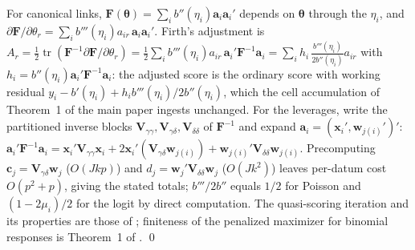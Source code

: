 \documentclass[11pt]{article}
\newcommand{\tr}{\operatorname{tr}}
\newcommand{\btheta}{\bm{\theta}}
\newcommand{\bx}{\mathbf{x}}
\newcommand{\bw}{\mathbf{w}}
\newcommand{\ba}{\mathbf{a}}
\newcommand{\bc}{\mathbf{c}}
\newcommand{\bF}{\mathbf{F}}
\newcommand{\bV}{\mathbf{V}}
\begin{document}
For canonical links, $\bF(\btheta) = \sum_i b''(\eta_i)\ba_i\ba_i'$
depends on $\btheta$ through the $\eta_i$, and $\partial \bF /
\partial\theta_r = \sum_i b'''(\eta_i) a_{ir}\, \ba_i\ba_i'$.  Firth's
adjustment \citep{firth1993} is $A_r = \tfrac12 \tr(\bF^{-1}
\partial\bF/\partial\theta_r) = \tfrac12 \sum_i b'''(\eta_i) a_{ir}\,
\ba_i'\bF^{-1}\ba_i = \sum_i h_i\, \frac{b'''(\eta_i)}{2 b''(\eta_i)}
a_{ir}$ with $h_i = b''(\eta_i)\ba_i'\bF^{-1}\ba_i$: the adjusted score
is the ordinary score with working residual $y_i - b'(\eta_i) + h_i
b'''(\eta_i)/2b''(\eta_i)$, which the cell accumulation of
Theorem~1 of the main paper ingests unchanged.  For the leverages, write
the partitioned inverse blocks $\bV_{\gamma\gamma}, \bV_{\gamma\delta},
\bV_{\delta\delta}$ of $\bF^{-1}$ and expand $\ba_i =
(\bx_i', \bw_{j(i)}')'$:
$\ba_i'\bF^{-1}\ba_i = \bx_i'\bV_{\gamma\gamma}\bx_i + 2\bx_i'
(\bV_{\gamma\delta}\bw_{j(i)}) + \bw_{j(i)}'\bV_{\delta\delta}
\bw_{j(i)}$.  Precomputing $\bc_j = \bV_{\gamma\delta}\bw_j$ ($O(Jkp)$)
and $d_j = \bw_j'\bV_{\delta\delta}\bw_j$ ($O(Jk^2)$) leaves per-datum
cost $O(p^2 + p)$, giving the stated totals; $b'''/2b''$ equals $1/2$
for Poisson and $(1-2\mu_i)/2$ for the logit by direct computation.
The quasi-scoring iteration and its properties are those of
\citet{kosmidis2009}; finiteness of the penalized maximizer for binomial
responses is Theorem~1 of \citet{heinze2002}. \qed




\end{document}
